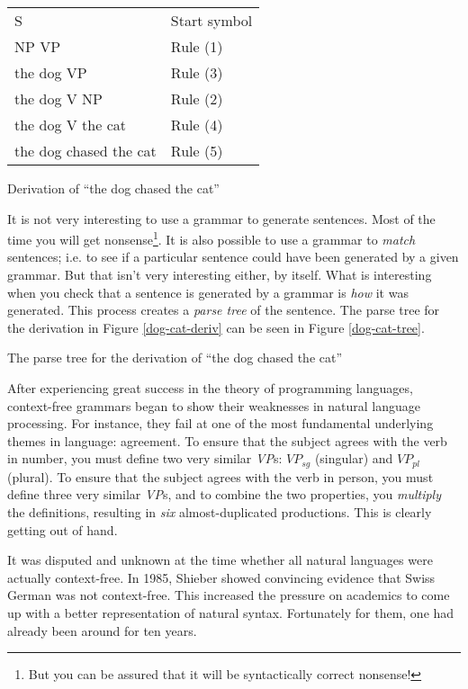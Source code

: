\documentclass[12pt]{article}
\newcommand{\defn}[1]{\textit{#1}}
\begin{document}
\begin{Figure}
\begin{tabularx}{\linewidth}{X|X}
S                      & Start symbol \\
NP VP                  & Rule (1) \\
the dog VP             & Rule (3) \\
the dog V NP           & Rule (2) \\
the dog V the cat      & Rule (4) \\
the dog chased the cat & Rule (5) \\
\end{tabularx}
\caption{Derivation of ``the dog chased the cat''}
\label{dog-cat-deriv}
\end{Figure}

It is not very interesting to use a grammar to generate sentences.  Most
of the time you will get nonsense\footnote{But you can be assured that
it will be syntactically correct nonsense!}.  It is also possible to use
a grammar to \textit{match} sentences; i.e. to see if a particular
sentence could have been generated by a given grammar.   But that isn't
very interesting either, by itself.  What is interesting when you
check that a sentence is generated by a grammar is \textit{how} it was
generated.  This process creates a \defn{parse tree} of the sentence.
The parse tree for the derivation in Figure \ref{dog-cat-deriv} can be
seen in Figure \ref{dog-cat-tree}.

\begin{Figure}
\caption{The parse tree for the derivation of ``the dog chased the
cat''}
\label{dog-cat-tree}
\end{Figure}

After experiencing great success in the theory of programming languages,
context-free grammars began to show their weaknesses in natural language
processing.  For instance, they fail at one of the most fundamental
underlying themes in language: agreement.  To ensure that the subject
agrees with the verb in number, you must define two very similar
\textit{VP}s: $\mathit{VP}_\mathit{sg}$ (singular) and
$\mathit{VP}_\mathit{pl}$ (plural).  To ensure that the subject agrees
with the verb in person, you must define three very similar
\textit{VP}s, and to combine the two properties, you \textit{multiply}
the definitions, resulting in \textit{six} almost-duplicated
productions.  This is clearly getting out of hand.

It was disputed and unknown at the time whether all natural languages
were actually context-free.  In 1985, Shieber\cite{Shieber-1985} showed
convincing evidence that Swiss German was not context-free.  This
increased the pressure on academics to come up with a better
representation of natural syntax.  Fortunately for them, one had already
been around for ten years.
\end{document}
